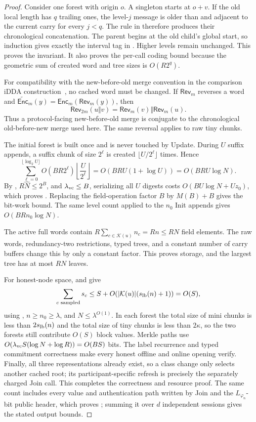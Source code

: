 \documentclass[11pt]{article}
\begin{document}
\begin{proof}
Consider one forest with origin $o$.  A singleton starts at $o+v$.  If the old
local length has $q$ trailing ones, the level-$j$ message is older than and
adjacent to the current carry for every $j<q$.  The rule in 
therefore produces their chronological concatenation.  The parent begins at
the old child's global start, so induction gives exactly the interval tag in
.  Higher levels remain unchanged.  This proves the
invariant.  It also proves the per-call coding bound because the geometric
sum of created word and tree sizes is $O(R2^q)$.

For compatibility with the new-before-old merge convention in the comparison
iDDA construction~\cite{ShiSilverMu2026}, no cached word must be changed.  If
$\mathsf{Rev}_m$ reverses a word and
$\widetilde{\mathsf{Enc}}_m(y)=\mathsf{Enc}_m(\mathsf{Rev}_m(y))$, then
\[
 \mathsf{Rev}_{2m}(u\Vert v)
   =\mathsf{Rev}_m(v)\Vert\mathsf{Rev}_m(u).
\]
Thus a protocol-facing new-before-old merge is conjugate to the chronological
old-before-new merge used here.  The same reversal applies to raw tiny chunks.

The initial forest is built once and is never touched by Update.  During $U$
suffix appends, a suffix chunk of size $2^\ell$ is created
$\lfloor U/2^\ell\rfloor$ times.  Hence
\[
 \sum_{\ell=0}^{\lfloor\log_2U\rfloor}
 O(BR2^\ell)\left\lfloor\frac U{2^\ell}\right\rfloor
 =O(BRU(1+\log U))=O(BRU\log N).
\]
By , $R\widehat N\le2^B$, and
$\lambda_{\rm vc}\le B$, serializing all $U$ digests costs
$O(BU\log N+Uz_0)$, which proves .  Replacing the
field-operation factor $B$ by $M(B)+B$ gives the bit-work bound.  The same
level count applied to the $n_0$ Init appends gives $O(BRn_0\log N)$.

The active full words contain
$R\sum_{c\in\mathcal K(u)}n_c=Rn\le RN$ field elements.  The raw words,
redundancy-two restrictions, typed trees, and a constant number of carry
buffers change this by only a constant factor.  This proves storage, and the
largest tree has at most $RN$ leaves.

For honest-node space,  and  give
\[
 \sum_{c\text{ sampled}}s_c
 \le S+O(|\mathcal K(u)|(s_{\rm lb}(n)+1))=O(S),
\]
using , $n\ge n_0\ge\lambda$, and
$N\le\lambda^{O(1)}$.  In each forest the total size of mini chunks is less
than $2s_{\rm lb}(n)$ and the total size of tiny chunks is less than
$2\kappa$, so the two forests still contribute $O(S)$ block values.  Merkle
paths use $O(\lambda_{\rm vc}S(\log N+\log R))=O(BS)$ bits.  The label
recurrence and typed commitment correctness make every honest offline and
online opening verify.  Finally, all three representations already exist, so
a class change only selects another cached root; its participant-specific
refresh is precisely the separately charged Join call.  This completes the
correctness and resource proof.  The same count includes every value and
authentication path written by Join and the $L_{\varphi_n}$-bit public header,
which proves ; summing it over $d$ independent sessions
gives the stated output bounds.
\end{proof}
\end{document}
